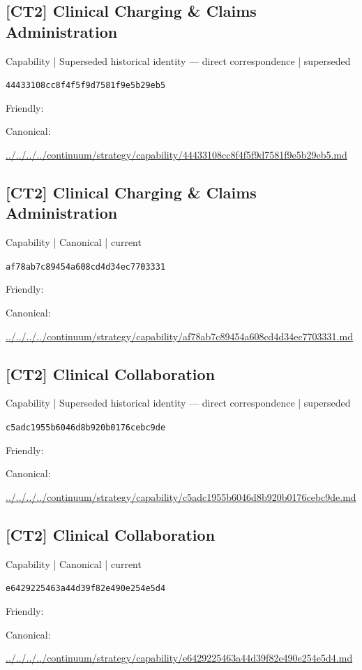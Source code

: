 \documentclass[10pt,a4paper]{article}
\begin{document}
\subsection*{[CT2] Clinical Charging \& Claims Administration}
{\small Capability | Superseded historical identity — direct correspondence | superseded}\par
\texttt{44433108cc8f4f5f9d7581f9e5b29eb5}\par
Friendly: \par
Canonical: \par
{\footnotesize\url{../../../../continuum/strategy/capability/44433108cc8f4f5f9d7581f9e5b29eb5.md}}\par
\subsection*{[CT2] Clinical Charging \& Claims Administration}
{\small Capability | Canonical | current}\par
\texttt{af78ab7c89454a608cd4d34ec7703331}\par
Friendly: \par
Canonical: \par
{\footnotesize\url{../../../../continuum/strategy/capability/af78ab7c89454a608cd4d34ec7703331.md}}\par
\subsection*{[CT2] Clinical Collaboration}
{\small Capability | Superseded historical identity — direct correspondence | superseded}\par
\texttt{c5adc1955b6046d8b920b0176cebc9de}\par
Friendly: \par
Canonical: \par
{\footnotesize\url{../../../../continuum/strategy/capability/c5adc1955b6046d8b920b0176cebc9de.md}}\par
\subsection*{[CT2] Clinical Collaboration}
{\small Capability | Canonical | current}\par
\texttt{e6429225463a44d39f82e490e254e5d4}\par
Friendly: \par
Canonical: \par
{\footnotesize\url{../../../../continuum/strategy/capability/e6429225463a44d39f82e490e254e5d4.md}}\par
\end{document}
